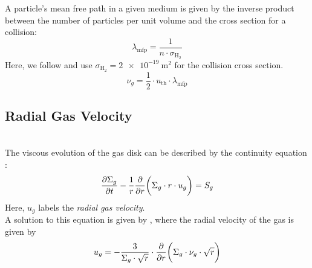        A particle's mean free path in a given medium is given by the inverse product between the 
        number of particles per unit volume and the cross section for a collision:
        \begin{equation}
            \lambda_\text{mfp} = \frac{1}{n \cdot \sigma_{\text{H}_2}}
        \end{equation}
        Here, we follow \cite{birnstiel_dullemond_brauer_2010} and use 
        $\sigma_{\text{H}_2} = \SI{2e-19}{\meter^2}$ for the collision cross section. \\

        \begin{equation}
            \nu_g = \frac{1}{2} \cdot u_\text{th} \cdot \lambda_\text{mfp}
        \end{equation}

        

    \newpage\subsection{Radial Gas Velocity}

         \\

        The viscous evolution of the gas disk can be described by the continuity equation 
        \cite{birnstiel_dullemond_brauer_2010}:
        \begin{equation}
            \frac{\partial \Sigma_g}{\partial t}-\frac{1}{r}\frac{\partial }{\partial r}\bigg(\Sigma_g \cdot r \cdot u_g\bigg) = S_g
        \end{equation}
        Here, $u_g$ labels the \textit{radial gas velocity}.
        \\

        A solution to this equation is given by \cite{lynden-bell_pringle_1974}, where the 
        radial velocity of the gas is given by
        \begin{equation}
            u_{g}
            =-\frac{3}{\Sigma_g\cdot\sqrt{r}}
                \cdot\frac{\partial }{\partial r}\bigg(\Sigma_g \cdot \nu_g \cdot \sqrt{r}\bigg)
        \end{equation}

